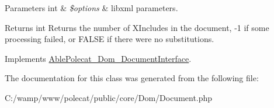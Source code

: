 \begin{DoxyParams}[1]{Parameters}
int & {\em \$options} & libxml parameters.\\
\hline
\end{DoxyParams}
\begin{DoxyReturn}{Returns}
int Returns the number of X\+Includes in the document, -\/1 if some processing failed, or F\+A\+L\+S\+E if there were no substitutions. 
\end{DoxyReturn}


Implements \hyperlink{interface_able_polecat___dom___document_interface_a3d0818bb6eda112a1b359cc41b40b2a9}{Able\+Polecat\+\_\+\+Dom\+\_\+\+Document\+Interface}.



The documentation for this class was generated from the following file\+:\begin{DoxyCompactItemize}
\item 
C\+:/wamp/www/polecat/public/core/\+Dom/Document.\+php\end{DoxyCompactItemize}
